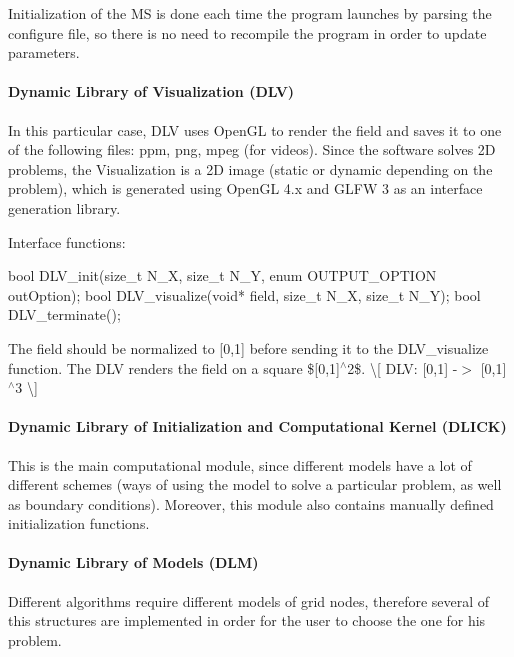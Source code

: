 Initialization of the MS is done each time the program launches by parsing the configure file, so there is no need to recompile the program in order to update parameters.

\paragraph*{Dynamic Library of Visualization (D\+LV)}

In this particular case, D\+LV uses Open\+GL to render the field and saves it to one of the following files\+: ppm, png, mpeg (for videos). Since the software solves 2D problems, the Visualization is a 2D image (static or dynamic depending on the problem), which is generated using Open\+GL 4.\+x and G\+L\+FW 3 as an interface generation library.

Interface functions\+:


\begin{DoxyCode}
bool DLV\_init(size\_t N\_X, size\_t N\_Y, enum OUTPUT\_OPTION outOption);
bool DLV\_visualize(void* field, size\_t N\_X, size\_t N\_Y);
bool DLV\_terminate();
\end{DoxyCode}


The field should be normalized to \mbox{[}0,1\mbox{]} before sending it to the {\ttfamily D\+L\+V\+\_\+visualize} function. The D\+LV renders the field on a square \$\mbox{[}0,1\mbox{]}$^\wedge$2\$. \textbackslash{}\mbox{[} D\+LV\+: \mbox{[}0,1\mbox{]} -\/$>$ \mbox{[}0,1\mbox{]}$^\wedge$3 \textbackslash{}\mbox{]}

\paragraph*{Dynamic Library of Initialization and Computational Kernel (D\+L\+I\+CK)}

This is the main computational module, since different models have a lot of different schemes (ways of using the model to solve a particular problem, as well as boundary conditions). Moreover, this module also contains manually defined initialization functions.

\paragraph*{Dynamic Library of Models (D\+LM)}

Different algorithms require different models of grid nodes, therefore several of this structures are implemented in order for the user to choose the one for his problem.

